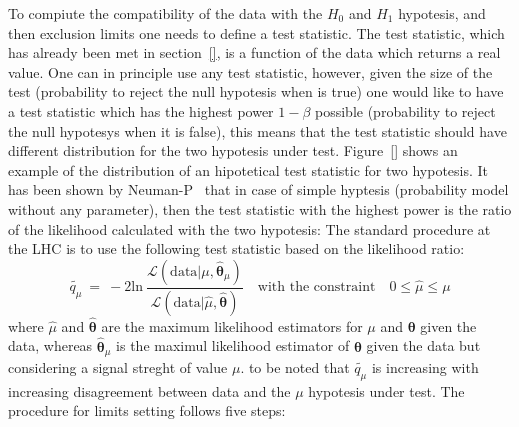 To compiute the compatibility of the data with the $H_{0}$ and $H_{1}$ hypotesis, and then exclusion limits 
one needs to define a test statistic. The test statistic, which has already been met in section~\ref{},
is a function of the data which returns a real value. One can in principle use any test statistic, however, 
given the size of the test (probability to reject the null hypotesis when is true) one would like to have 
a test statistic which has the highest power $1 - \beta$ possible (probability to reject the 
null hypotesys when it is false), this means that the test statistic should have 
different distribution for the two hypotesis under test. Figure~\ref{} shows an example
of the distribution of an hipotetical test statistic for two hypotesis.
It has been shown by Neuman-P~\cite{} that in case of simple hyptesis (probability model without any parameter),
then the test statistic with the highest power is the ratio of the likelihood calculated with the two hypotesis:
The standard procedure at the LHC is to use the following test statistic \cite{} based on the likelihood ratio:
$$
\tilde{q_{\mu}} ~ = ~ -2 \text{ln} ~ \frac{\mathcal{L}(\text{data}|\mu, \hat{\boldsymbol{\theta}}_{\mu})}{\mathcal{L}(\text{data}|\hat{\mu}, \hat{\boldsymbol{\theta}})}
\quad \text{with the constraint} \quad 0 \leq \hat{\mu} \leq \mu
$$
 where $\hat{\mu}$ and $\hat{\boldsymbol{\theta}}$ are the maximum likelihood estimators for $\mu$ and $\boldsymbol{\theta}$ given the data, 
whereas $\hat{\boldsymbol{\theta}}_{\mu}$ is the maximul likelihood estimator of $\boldsymbol{\theta}$ given the data but considering
a signal streght of value $\mu$. to be noted that $\tilde{q_{\mu}}$ is increasing with increasing disagreement between data and the $\mu$ hypotesis under test.
The procedure for limits setting follows five steps:
